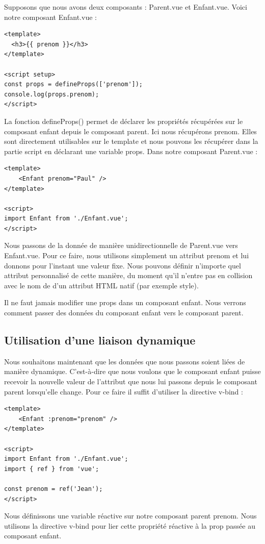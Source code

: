 Supposons que nous avons deux composants : {\color{monOrange}Parent.vue} et {\color{monOrange}Enfant.vue}. Voici notre composant {\color{monOrange}Enfant.vue} :
\begin{verbatim}
<template>
  <h3>{{ prenom }}</h3>
</template>

<script setup>
const props = defineProps(['prenom']);
console.log(props.prenom);
</script>
\end{verbatim}
La fonction {\color{monOrange}defineProps()} permet de déclarer les propriétés récupérées sur le composant enfant depuis le composant parent. Ici nous récupérons {\color{monOrange}prenom}. Elles sont directement utilisables sur le {\color{monOrange}template} et nous pouvons les récupérer dans la partie {\color{monOrange}script} en déclarant une variable {\color{monOrange}props}. Dans notre composant {\color{monOrange}Parent.vue} :
\begin{verbatim}
<template>
    <Enfant prenom="Paul" />
</template>

<script>
import Enfant from './Enfant.vue';
</script>
\end{verbatim}
Nous passons de la donnée de manière unidirectionnelle de {\color{monOrange}Parent.vue} vers {\color{monOrange}Enfant.vue}. Pour ce faire, nous utilisons simplement un attribut {\color{monOrange}prenom} et lui donnons pour l'instant une valeur fixe. Nous pouvons définir n'importe quel attribut personnalisé de cette manière, du moment qu'il n'entre pas en collision avec le nom de d'un attribut HTML natif (par exemple {\color{monOrange}style}).

Il ne faut jamais modifier une {\color{monOrange}props} dans un composant enfant. Nous verrons comment passer des données du composant enfant vers le composant parent.

\subsection{Utilisation d'une liaison dynamique}
Nous souhaitons maintenant que les données que nous passons soient liées de manière dynamique. C'est-à-dire que nous voulons que le composant enfant puisse recevoir la nouvelle valeur de l'attribut que nous lui passons depuis le composant parent lorsqu'elle change. Pour ce faire il suffit d'utiliser la directive {\color{monOrange}v-bind} :
\begin{verbatim}
<template>
    <Enfant :prenom="prenom" />
</template>

<script>
import Enfant from './Enfant.vue';
import { ref } from 'vue';

const prenom = ref('Jean');
</script>
\end{verbatim}
Nous définissons une variable réactive sur notre composant parent {\color{monOrange}prenom}. Nous utilisons la directive {\color{monOrange}v-bind} pour lier cette propriété réactive à la {\color{monOrange}prop} passée au composant enfant.

